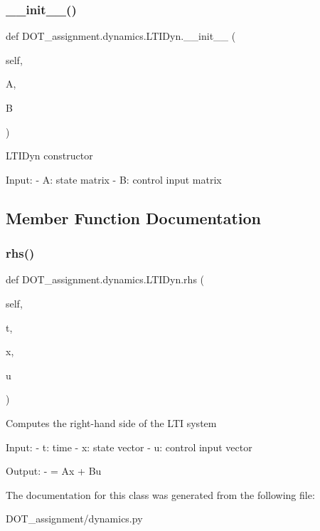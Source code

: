 \subsubsection{\texorpdfstring{\_\_init\_\_()}{\_\_init\_\_()}}
{\footnotesize\ttfamily def D\+O\+T\+\_\+assignment.\+dynamics.\+L\+T\+I\+Dyn.\+\_\+\+\_\+init\+\_\+\+\_\+ (\begin{DoxyParamCaption}\item[{}]{self,  }\item[{}]{A,  }\item[{}]{B }\end{DoxyParamCaption})}

\begin{DoxyVerb}LTIDyn constructor

Input:
- A:            state matrix
- B:            control input matrix\end{DoxyVerb}
 

\subsection{Member Function Documentation}
\mbox{\label{class_d_o_t__assignment_1_1dynamics_1_1_l_t_i_dyn_a0dc3f0dfdbdc223af24ca048858ec02e}} 
\subsubsection{\texorpdfstring{rhs()}{rhs()}}
{\footnotesize\ttfamily def D\+O\+T\+\_\+assignment.\+dynamics.\+L\+T\+I\+Dyn.\+rhs (\begin{DoxyParamCaption}\item[{}]{self,  }\item[{}]{t,  }\item[{}]{x,  }\item[{}]{u }\end{DoxyParamCaption})}

\begin{DoxyVerb}Computes the right-hand side of the LTI system

Input:
- t:            time
- x:            state vector
- u:            control input vector

Output:
-  = Ax + Bu\end{DoxyVerb}
 

The documentation for this class was generated from the following file\+:\begin{DoxyCompactItemize}
\item 
D\+O\+T\+\_\+assignment/dynamics.\+py\end{DoxyCompactItemize}
